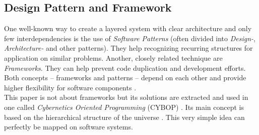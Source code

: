 %
%
%
%
%
%
%

\subsection{Design Pattern and Framework}
\label{design_pattern_and_framework_heading}

One well-known way to create a layered system with clear architecture and only
few interdependencies is the use of \emph{Software Patterns} (often divided
into \emph{Design-}, \emph{Architecture-} and other patterns). They help
recognizing recurring structures for application on similar problems.
Another, closely related technique are \emph{Frameworks}. They can help prevent
code duplication and development efforts.
Both concepts -- frameworks and patterns -- depend on each other and provide
higher flexibility for software components \cite{pree}.\\
This paper is not about frameworks but its solutions are extracted and used in
one called \emph{Cybernetics Oriented Programming} (CYBOP) \cite{cybop}.
Its main concept is based on the hierarchical structure of the universe
\cite{hellerbohl}. This very simple idea can perfectly be mapped on software
systems.

